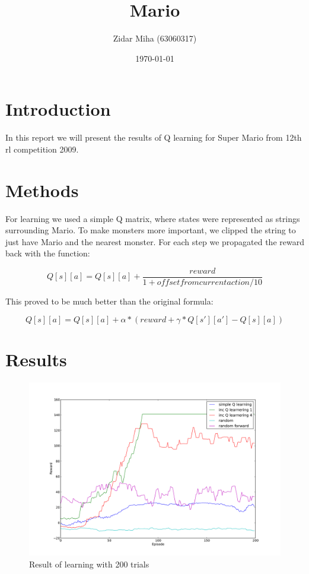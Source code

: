 \documentclass[a4paper,11pt]{article}
\title{Mario}
\author{Zidar Miha (63060317)}
\date{\today}
\begin{document}
\maketitle

\section{Introduction}

In this report we will present the results of Q learning for Super Mario from 12th rl competition 2009.


\section{Methods}

For learning we used a simple Q matrix, where states were represented as strings surrounding Mario. To make monsters more important, we clipped the string to just have Mario and the nearest monster. For each step we propagated the reward back with the function:

\begin{equation} \label{eq1}
Q[s][a] = Q[s][a] + \frac{reward}{ 1 + offset from current action / 10} 
\end{equation}

This proved to be much better than the original formula:

\begin{equation} \label{eq2}
Q[s][a] = Q[s][a] + \alpha * (reward + \gamma * Q[s'][a'] - Q[s][a])
\end{equation}

\section{Results}

\begin{figure}[htbp]
    \begin{center}
        \includegraphics[scale=0.4]{graph.pdf}
        \caption{Result of learning with 200 trials}
        \label{graph}
    \end{center}
\end{figure}
\end{document}
